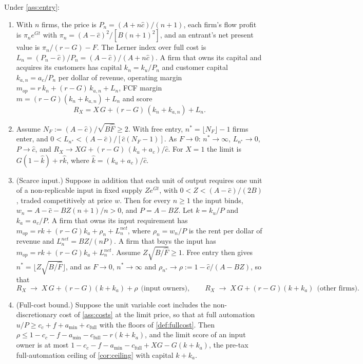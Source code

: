 \begin{proposition}\label{prop:entry}
Under \autoref{ass:entry}:
\begin{enumerate}
\item[(a)] With $n$ firms, the price is $P_n=(A+n\hat c)/(n+1)$, each firm's flow profit is $\pi_ne^{Gt}$ with $\pi_n=(A-\hat c)^2/[B(n+1)^2]$, and an entrant's net present value is $\pi_n/(r-G)-F$. The Lerner index over full cost is $L_n=(P_n-\hat c)/P_n=(A-\hat c)/(A+n\hat c)$. A firm that owns its capital and acquires its customers has capital $k_n=k_u/P_n$ and customer capital $k_{a,n}=a_c/P_n$ per dollar of revenue, operating margin $m_{op}=r\,k_n+(r-G)\,k_{a,n}+L_n$, FCF margin $m=(r-G)(k_n+k_{a,n})+L_n$ and score
\begin{equation}\label{eq:Rentry}
R_X=X\,G+(r-G)\,(k_n+k_{a,n})+L_n .
\end{equation}
\item[(b)] Assume $N_F:=(A-\hat c)/\sqrt{B\hat F}\ge 2$. With free entry, $n^*=\lfloor N_F\rfloor-1$ firms enter, and $0<L_{n^*}<(A-\hat c)/[\hat c(N_F-1)]$. As $F\to 0$: $n^*\to\infty$, $L_{n^*}\to 0$, $P\to\hat c$, and $R_X\to XG+(r-G)\,(k_u+a_c)/\hat c$. For $X=1$ the limit is $G(1-\hat k)+r\hat k$, where $\hat k=(k_u+a_c)/\hat c$.
\item[(c)] (Scarce input.) Suppose in addition that each unit of output requires one unit of a non-replicable input in fixed supply $Ze^{Gt}$, with $0<Z<(A-\hat c)/(2B)$, traded competitively at price $w$. Then for every $n\ge 1$ the input binds, $w_n=A-\hat c-BZ(n+1)/n>0$, and $P=A-BZ$. Let $k=k_u/P$ and $k_a=a_c/P$. A firm that owns its input requirement has $m_{op}=rk+(r-G)k_a+\rho_n+L_n^{net}$, where $\rho_n=w_n/P$ is the rent per dollar of revenue and $L_n^{net}=BZ/(nP)$. A firm that buys the input has $m_{op}=rk+(r-G)k_a+L_n^{net}$. Assume $Z\sqrt{B/\hat F}\ge 1$. Free entry then gives $n^*=\lfloor Z\sqrt{B/\hat F}\rfloor$, and as $F\to 0$, $n^*\to\infty$ and $\rho_{n^*}\to\rho:=1-\hat c/(A-BZ)$, so that
\begin{equation}\label{eq:Rrent}
R_X\;\to\;X\,G+(r-G)(k+k_a)+\rho\ \ \text{(input owners)},\qquad R_X\;\to\;X\,G+(r-G)(k+k_a)\ \ \text{(other firms)}.
\end{equation}
\item[(d)] (Full-cost bound.) Suppose the unit variable cost includes the non-discretionary cost of \autoref{ass:costs} at the limit price, so that at full automation $u/P\ge c_c+f+a_{\min}+c_{\mathrm{full}}$ with the floors of \autoref{def:fullcost}. Then $\rho\le1-c_c-f-a_{\min}-c_{\mathrm{full}}-r(k+k_a)$, and the limit score of an input owner is at most $1-c_c-f-a_{\min}-c_{\mathrm{full}}+XG-G(k+k_a)$, the pre-tax full-automation ceiling of \autoref{cor:ceiling} with capital $k+k_a$.
\end{enumerate}
\end{proposition}


